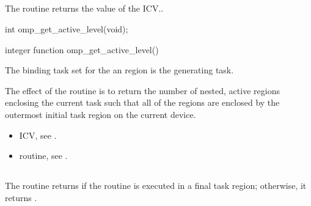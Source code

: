 \subsection{}
\label{subsec:omp_get_active_level}
\summary
The  routine returns the value of the  ICV..

\format
\begin{ccppspecific}
\begin{ompcFunction}
int omp_get_active_level(void);
\end{ompcFunction}
\end{ccppspecific}

\begin{fortranspecific}
\begin{ompfFunction}
integer function omp_get_active_level()
\end{ompfFunction}
\end{fortranspecific}

\binding
The binding task set for the an  region is the generating
task.

\effect
The effect of the  routine is to return the number of nested,
active  regions enclosing the current task such that all of the 
regions are enclosed by the outermost initial task region on the current device.

\crossreferences
\begin{itemize}
\item {} ICV, see
.

\item {} routine, see
.
\end{itemize}











\subsection{}
\label{subsec:omp_in_final}
\summary
The  routine returns  if the routine is executed in a final task
region; otherwise, it returns .

